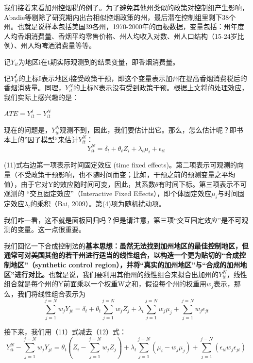 \documentclass[cn,12pt,math=newtx,citestyle=gb7714-2015,bibstyle=gb7714-2015]{elegantbook}
\begin{document}
	我们接着来看加州控烟税的例子。为了避免其他州类似的政策对控制组产生影响，Abadie等剔除了研究期内出台相似控烟政策的州，最后潜在控制组里剩下38个州。也就是说样本包括美国39各州，1970-2000年的面板数据，变量包括：州年度人均香烟消费量、香烟平均零售价格、州人均收入对数、州人口结构（15-24岁比例）、州人均啤酒消费量等等。
	
	记$Y_{it}$为地区i在t期实际观测到的结果变量，即香烟消费量。
	
	记$Y_{it}^I$的上标I表示地区i接受政策干预，即这个变量表示加州在提高香烟消费税后的香烟消费量。同理，$Y_{it}^N$的上标N表示没有受到政策干预。根据上文将的处理效应，我们实际上感兴趣的是：
	\begin{center}
		$ATE=Y_{it}^I-Y_{it}^N$
	\end{center}
	
	现在的问题是，$Y_{it}^N$观测不到，因此，我们要估计出它。那么，怎么估计呢？即书本上的”因子模型“来估计$Y_{it}^N$：
	\begin{equation}
		Y_{it}^N=\delta_t+\theta_tZ_i+\lambda_t\mu_i+\epsilon_{it}
	\end{equation}
	
	(11)式右边第一项表示时间固定效应 (time fixed effects)。第二项表示可观测的向量（不受政策干预影响，也不随时间而变；比如，干预之前的预测变量之平均值），由于它对Y的效应随时间可变，因此，其系数$\theta$有时间下标。第三项表示不可观测的 “交互固定效应”（Interactive Fixed Effects），即个体固定效应$\mu_i$与时间固定效应$\lambda_t$的乘积（Bai, 2009）。第(4)项为随机扰动项。
	
	我们咋一看，这不就是面板回归吗？但是请注意，第三项“交互固定效应”是不可观测的变量。这一点很重要。
	
	我们回忆一下合成控制法的\textbf{基本思想：虽然无法找到加州地区的最佳控制地区，但通常可对美国其他的若干州进行适当的线性组合，以构造一个更为贴切的“合成控制地区”（synthetic control region），并将“真实的加州地区”与“合成的加州地区”进行对比。}也就是说，我们要利用其他州的线性组合来拟合出加州的$Y_{it}^N$，线性组合就是每个州的Y前面乘以一个权重W之和，假设每个州的权重用$w_j$表示，那么，我们将线性组合表示为
	\begin{equation}
		\sum_{j=1}^{j=N}w_jY_{jt}=\delta_t+\theta_t\sum_{j=1}^{j=N}w_jZ_j+\lambda_t\sum_{j=1}^{j=N}w_j\mu_j+\sum_{j=1}^{j=N}w_j\epsilon_{jt}
	\end{equation}
	
	接下来，我们用（11）式减去（12）式：
	\begin{equation}
		Y_{it}^N-\sum_{j=1}^{j=N}w_jY_{jt}=\theta_t(Z_i-\sum_{j=1}^{j=N}w_jZ_j)+\lambda_t\sum_{j=1}^{j=N}(\mu_i-w_j\mu_j)+\sum_{j=1}^{j=N}(\epsilon_{it}w_j\epsilon_{jt})
	\end{equation}
	
\end{document}
